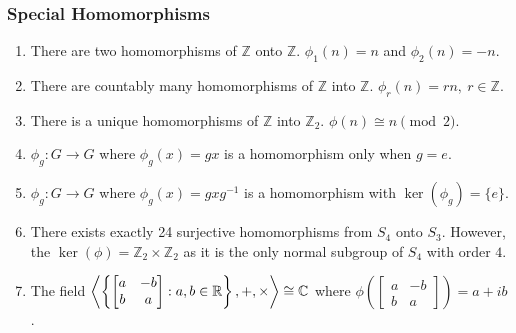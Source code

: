 \subsubsection{Special Homomorphisms}
\begin{enumerate}
	\item There are  two homomorphisms of $\mathbb{Z}$ onto $\mathbb{Z}$. $\phi_1(n) = n$ and $\phi_2(n) = -n$.
	\item There are countably many homomorphisms of $\mathbb{Z}$ into $\mathbb{Z}$. $\phi_r(n) = rn,\ r \in \mathbb{Z}$.
	\item There is a unique homomorphisms of $\mathbb{Z}$ into $\mathbb{Z}_2$. $\phi(n) \cong n \pmod{2}$.
	\item $\phi_g : G \to G$ where $\phi_g(x) = gx$ is a homomorphism only when $g = e$.
	\item $\phi_g : G \to G$ where $\phi_g(x) = gxg^{-1}$ is a homomorphism with $\ker(\phi_g) = \{ e \}$.
	\item There exists exactly 24 surjective homomorphisms from $S_4$ onto $S_3$. However, the $\ker(\phi) = \mathbb{Z}_2 \times \mathbb{Z}_2$ as it is the only normal subgroup of $S_4$ with order $4$.
	\item The field $\left\langle \left\{\begin{bmatrix} a & -b \\ b & a \end{bmatrix} : a,b \in \mathbb{R} \right\},+,\times \right\rangle \cong \mathbb{C}$ where $\phi\left(\begin{bmatrix} a & -b \\ b & a \end{bmatrix}\right) = a+ib$.
\end{enumerate}

